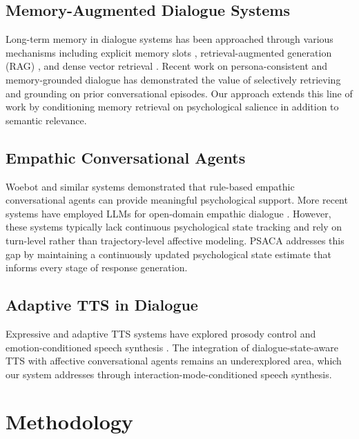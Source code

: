 \documentclass[conference]{IEEEtran}
\begin{document}
\subsection{Memory-Augmented Dialogue Systems}

Long-term memory in dialogue systems has been approached through various mechanisms including explicit memory slots \cite{sukhbaatar2015end}, retrieval-augmented generation (RAG) \cite{lewis2020retrieval}, and dense vector retrieval \cite{karpukhin2020dense}. Recent work on persona-consistent and memory-grounded dialogue \cite{xu2021beyond, zhong2022dialoglm} has demonstrated the value of selectively retrieving and grounding on prior conversational episodes. Our approach extends this line of work by conditioning memory retrieval on psychological salience in addition to semantic relevance.

\subsection{Empathic Conversational Agents}

Woebot \cite{fitzpatrick2017delivering} and similar systems demonstrated that rule-based empathic conversational agents can provide meaningful psychological support. More recent systems have employed LLMs for open-domain empathic dialogue \cite{rashkin2019towards, majumder2020mime}. However, these systems typically lack continuous psychological state tracking and rely on turn-level rather than trajectory-level affective modeling. PSACA addresses this gap by maintaining a continuously updated psychological state estimate that informs every stage of response generation.

\subsection{Adaptive TTS in Dialogue}

Expressive and adaptive TTS systems have explored prosody control \cite{shen2018natural, ren2020fastspeech} and emotion-conditioned speech synthesis \cite{lei2022msemotts}. The integration of dialogue-state-aware TTS with affective conversational agents remains an underexplored area, which our system addresses through interaction-mode-conditioned speech synthesis.

\section{Methodology}
\label{sec:methodology}
\end{document}

